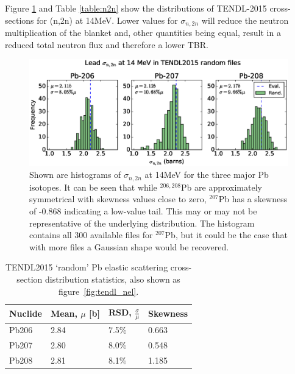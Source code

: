 Figure \ref{fig:tendl_n2n} and Table \ref{table:n2n} show the distributions of TENDL-2015 cross-sections for (n,2n) at 14MeV. Lower values for $\sigma_{n,2n}$ will reduce the neutron multiplication of the blanket and, other quantities being equal, result in a reduced total neutron flux and therefore a lower TBR.

\begin{figure}[H]
	\includegraphics[width=\textwidth]{pb_tendl_n2n_hist}
	\caption{Shown are histograms of $\sigma_{n,2n}$ at 14MeV for the three major Pb isotopes. It can be seen that while $^{206,208}$Pb are approximately symmetrical with skewness values close to zero, $^{207}$Pb has a skewness of -0.868 indicating a low-value tail. This may or may not be representative of the underlying distribution. The histogram contains all 300 available files for $^{207}$Pb, but it could be the case that with more files a Gaussian shape would be recovered.}
	\label{fig:tendl_n2n}
\end{figure}

\begin{table}[H]
  \footnotesize
  \centering 
  \begin{tabular}{llll}
    \toprule
    Nuclide & Mean, $\mu$ [b] & RSD, $\frac{\sigma}{\mu}$ & Skewness \\
    \midrule
    Pb206 & 2.84 & 7.5\% & 0.663 \\
    Pb207 & 2.80 & 8.0\% & 0.548 \\
    Pb208 & 2.81 & 8.1\% & 1.185 \\
    \bottomrule
  \end{tabular}
  \caption{TENDL2015 `random' Pb elastic scattering cross-section distribution statistics, also shown as figure~\ref{fig:tendl_nel}.}
  \label{table:nel}
\end{table}

